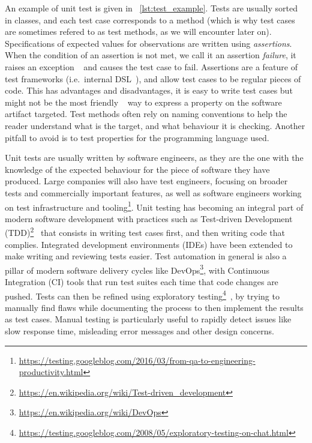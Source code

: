 \documentclass[11pt]{sdm_internship}
\newcommand{\rephrase}[1]{\colorbox{BlueViolet!60}{\textcolor{white}{\textbf{$\sim$#1}}}}
\theoremstyle{definition}
\begin{document}
An example of unit test is given in \listingname~\ref{lst:test_example}.
Tests are usually sorted in classes, and each test case corresponds to a method (which is why test cases are sometimes refered to as test methods, as we will encounter later on).
Specifications of expected values for observations are written using \emph{assertions}.
When the condition of an assertion is not met, we call it an assertion \emph{failure}, it raises an exception\rephrase{} and causes the test case to fail.
Assertions are a feature of test frameworks (i.e.\ internal DSL~\cite{fowler2010domain}), and allow test cases to be regular pieces of code.
This has advantages and disadvantages, it is easy to write test cases but might not be the most friendly\rephrase{} way to express a property on the software artifact targeted.
Test methods often rely on naming conventions to help the reader understand what is the target, and what behaviour it is checking.
Another pitfall to avoid is to test properties for the programming language used.

Unit tests are usually written by software engineers, as they are the one with the knowledge of the expected behaviour for the piece of software they have produced.
Large companies will also have test engineers, focusing on broader tests and commercially important features, as well as software engineers working on test infrastructure and tooling\footnote{\url{https://testing.googleblog.com/2016/03/from-qa-to-engineering-productivity.html}}.
Unit testing has becoming an integral part of modern software development with practices such as Test-driven Development (TDD)\footnote{\url{https://en.wikipedia.org/wiki/Test-driven_development}}~\cite{beck2003test} that consists in writing test cases first, and then writing code that complies.
Integrated development environments (IDEs) have been extended to make writing and reviewing tests easier.
Test automation in general is also a pillar of modern software delivery cycles like DevOps\footnote{\url{https://en.wikipedia.org/wiki/DevOps}}, with Continuous Integration (CI) tools that run test suites each time that code changes are pushed.
Tests can then be refined using exploratory testing\footnote{\url{https://testing.googleblog.com/2008/05/exploratory-testing-on-chat.html}}~\cite{kaner2000testing}, by trying to manually find flaws while documenting the process to then implement the results as test cases.
Manual testing is particularly useful to rapidly detect issues like slow response time, misleading error messages and other design concerns.
\end{document}
